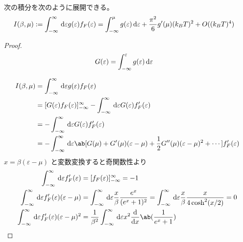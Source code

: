 \documentclass[a4paper,11pt]{jlreq}
\begin{document}
\begin{theorem}[ゾンマーフェルト展開]
  次の積分を次のように展開できる。
  \begin{align}
    I(\beta, \mu) & := \int_{-\infty}^{\infty}\dl{\varepsilon}g(\varepsilon)f_F(\varepsilon) = \int_{-\infty}^\mu g(\varepsilon)\dl{\varepsilon} + \frac{\pi^2}{6}g'(\mu)(k_BT)^2 + O((k_BT)^{4})
  \end{align}
\end{theorem}
\begin{proof}
  \begin{align}
    G(\varepsilon) & = \int_{-\infty}^\varepsilon g(\varepsilon)\dl{\varepsilon}
  \end{align}

  \begin{align}
    I(\beta, \mu) & = \int_{-\infty}^{\infty}\dl{\varepsilon}g(\varepsilon)f_F(\varepsilon)                                                                                  \\
                  & = [G(\varepsilon)f_F(\varepsilon)]_{-\infty}^{\infty} - \int_{-\infty}^{\infty}\dl{\varepsilon}G(\varepsilon)f_F'(\varepsilon)                           \\
                  & = - \int_{-\infty}^{\infty}\dl{\varepsilon}G(\varepsilon)f_F'(\varepsilon)                                                                               \\
                  & = - \int_{-\infty}^{\infty}\dl{\varepsilon}\ab[G(\mu) + G'(\mu)(\varepsilon - \mu) + \frac{1}{2}G''(\mu)(\varepsilon - \mu)^2 + \cdots]f_F'(\varepsilon)
  \end{align}
  $x = \beta(\varepsilon - \mu)$ と変数変換すると奇関数性より
  \begin{align}
    \int_{-\infty}^{\infty}\dl{\varepsilon}f_F'(\varepsilon)                      & = [f_F(\varepsilon)]_{-\infty}^{\infty} = -1                                                                                                                        \\
    \int_{-\infty}^{\infty}\dl{\varepsilon}f_F'(\varepsilon)(\varepsilon - \mu)   & = \int_{-\infty}^{\infty}\dl{\varepsilon}\frac{x}{\beta}\frac{e^x}{(e^x + 1)^2} = \int_{-\infty}^{\infty}\dl{\varepsilon}\frac{x}{\beta}\frac{x}{4\cosh^2(x/2)} = 0 \\
    \int_{-\infty}^{\infty}\dl{\varepsilon}f_F'(\varepsilon)(\varepsilon - \mu)^2 & = \frac{1}{\beta^2}\int_{-\infty}^{\infty}\dl{\varepsilon}x^2\diff{}{x}\ab(\frac{1}{e^x + 1})                                                                       \\

\end{align}
\end{proof}
\end{document}
